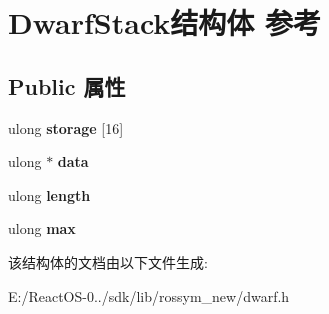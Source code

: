 \hypertarget{struct_dwarf_stack}{}\section{Dwarf\+Stack结构体 参考}
\label{struct_dwarf_stack}
\subsection*{Public 属性}
\begin{DoxyCompactItemize}
\item 
\mbox{\label{struct_dwarf_stack_a9ac112d0c52edbd3d5a349124eb86df5}} 
ulong {\bfseries storage} \mbox{[}16\mbox{]}
\item 
\mbox{\label{struct_dwarf_stack_ac923656850196c6a8ead4ca841860493}} 
ulong $\ast$ {\bfseries data}
\item 
\mbox{\label{struct_dwarf_stack_aabe2e76f94a9a5e66e81d9111123e8c6}} 
ulong {\bfseries length}
\item 
\mbox{\label{struct_dwarf_stack_ac8f408d9cd61a60b53bbe21a4aecccf6}} 
ulong {\bfseries max}
\end{DoxyCompactItemize}


该结构体的文档由以下文件生成\+:\begin{DoxyCompactItemize}
\item 
E\+:/\+React\+O\+S-\/0../sdk/lib/rossym\+\_\+new/dwarf.\+h\end{DoxyCompactItemize}
